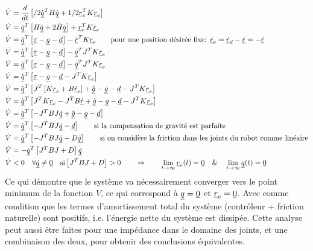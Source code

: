 \begin{align}
\dot{V} &= \frac{d}{dt} \left[ /2 \dot{\col{q}}^T H \dot{\col{q}}  + 1/2 \col{r}_e^T K \col{r}_e \right]  \\
\dot{V} &= \dot{\col{q}}^T 
\left[ 
H \ddot{\col{q}} + 2 \dot{H} \dot{\col{q}}
\right] +
\col{r}_e^T K \col{\dot{r}}_e
\\%
\dot{V} &= \dot{\col{q}}^T 
\left[ 
\col{\tau} - \col{g} - \col{d}
\right] -
\col{\dot{r}}^T K \col{r}_e
\quad \quad
\text{pour une position désirée fixe: }  \col{\dot{r}}_e = \col{\dot{r}}_d - \col{\dot{r}} = - \col{\dot{r}}
\\%
\dot{V} &= \dot{\col{q}}^T 
\left[ 
\col{\tau} - \col{g} - \col{d}
\right] -
\col{\dot{q}}^T J^T K \col{r}_e
\\%
\dot{V} &= \dot{\col{q}}^T 
\left[ 
\col{\tau} - \col{g} - \col{d}
\right] -
\col{\dot{q}}^T J^T K \col{r}_e
\\%
\dot{V} &= \dot{\col{q}}^T 
\left[ 
\col{\tau} - \col{g} - \col{d}
- J^T K \col{r}_e
\right]
\\%
\dot{V} &= \dot{\col{q}}^T 
\left[ 
J^T   \left[ K \col{r}_e + B \col{\dot{r}}_e \right] + \col{\hat{g}}
- \col{g} - \col{d}
- J^T K \col{r}_e
\right]
\\%
\dot{V} &= \dot{\col{q}}^T 
\left[ 
J^T  K \col{r}_e 
- J^T B \col{\dot{r}}
+ \col{\hat{g}}
- \col{g} - \col{d}
- J^T K \col{r}_e
\right]
\\%
\dot{V} &= \dot{\col{q}}^T 
\left[ 
- J^T B J \col{\dot{q}}
+ \col{\hat{g}}
- \col{g} - \col{d}
\right]
\\%
\dot{V} &= \dot{\col{q}}^T 
\left[ 
- J^T B J \col{\dot{q}} - \col{d}
\right]
\quad \quad
\text{si la compensation de gravité est parfaite}
\\%
\dot{V} &= \dot{\col{q}}^T 
\left[ 
- J^T B J \col{\dot{q}} - D \col{\dot{q}}
\right]
\quad \quad
\text{si on considère la friction dans les joints du robot comme linéaire}
\\%
\dot{V} &= - \dot{\col{q}}^T 
\left[ 
J^T B J + D 
\right] \col{\dot{q}}
\\%
\dot{V} &< 0 \quad  
\forall \col{\dot{q}} \neq \col{0} \quad 
\text{si} \left[ J^T B J + D \right]  > 0
\quad\quad \Rightarrow \quad\quad
\lim_{t \rightarrow \infty} \col{r}_e(t) = \col{0} \quad \& \quad
\lim_{t \rightarrow \infty} \col{q}(t) = \col{0}
\end{align} 
Ce qui démontre que le système va nécessairement converger vers le point minimum de la fonction $V$, ce qui correspond à $\underline{q} = \underline{0}$ et $\underline{r}_e = \underline{0}$. Avec comme condition que les termes d'amortissement total du système (contrôleur + friction naturelle) sont positifs, i.e. l'énergie nette du système est dissipée. Cette analyse peut aussi être faites pour une impédance dans le domaine des joints, et une combinaison des deux, pour obtenir des conclusions équivalentes. 

